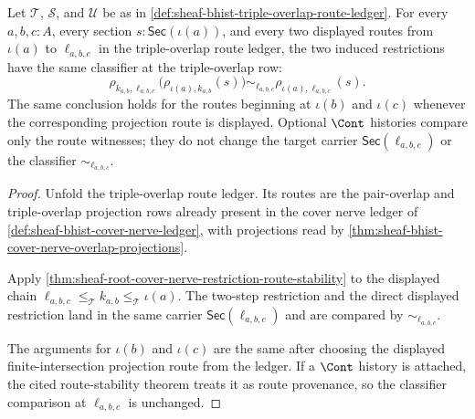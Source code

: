 \begin{theorem}
\label{thm:sheaf-bhist-triple-overlap-route-coherence}
Let $\mathcal{T}$, $\mathcal{S}$, and $\mathcal{U}$ be as in \autoref{def:sheaf-bhist-triple-overlap-route-ledger}. For every $a,b,c:A$, every section $s:\mathsf{Sec}(\iota(a))$, and every two displayed routes from $\iota(a)$ to $\ell_{a,b,c}$ in the triple-overlap route ledger, the two induced restrictions have the same classifier at the triple-overlap row:
$$
\rho_{k_{a,b},\ell_{a,b,c}}\bigl(\rho_{\iota(a),k_{a,b}}(s)\bigr)
\sim_{\ell_{a,b,c}}
\rho_{\iota(a),\ell_{a,b,c}}(s).
$$
The same conclusion holds for the routes beginning at $\iota(b)$ and $\iota(c)$ whenever the corresponding projection route is displayed. Optional $\Cont$ histories compare only the route witnesses; they do not change the target carrier $\mathsf{Sec}(\ell_{a,b,c})$ or the classifier $\sim_{\ell_{a,b,c}}$.
\end{theorem}
\begin{proof}
Unfold the triple-overlap route ledger. Its routes are the pair-overlap and triple-overlap projection rows already present in the cover nerve ledger of \autoref{def:sheaf-bhist-cover-nerve-ledger}, with projections read by \autoref{thm:sheaf-bhist-cover-nerve-overlap-projections}.

Apply \autoref{thm:sheaf-root-cover-nerve-restriction-route-stability} to the displayed chain $\ell_{a,b,c}\le_{\mathcal{T}}k_{a,b}\le_{\mathcal{T}}\iota(a)$. The two-step restriction and the direct displayed restriction land in the same carrier $\mathsf{Sec}(\ell_{a,b,c})$ and are compared by $\sim_{\ell_{a,b,c}}$.

The arguments for $\iota(b)$ and $\iota(c)$ are the same after choosing the displayed finite-intersection projection route from the ledger. If a $\Cont$ history is attached, the cited route-stability theorem treats it as route provenance, so the classifier comparison at $\ell_{a,b,c}$ is unchanged.
\end{proof}

